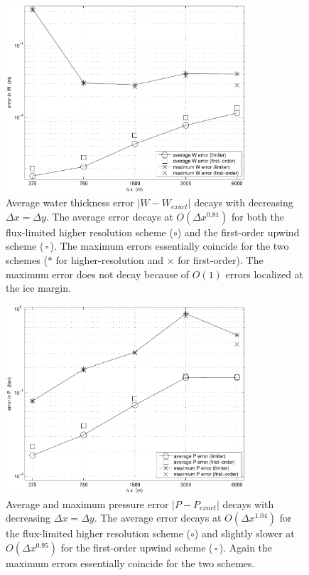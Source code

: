 \documentclass[11pt,final]{amsart}%
\begin{document}
\begin{figure}[ht]
\includegraphics[width=3.5in,keepaspectratio=true]{figs/refineW}
\caption{Average water thickness error $|W-W_{exact}|$ decays with decreasing $\Delta x = \Delta y$.  The average error decays at $O(\Delta x^{0.81})$ for both the flux-limited higher resolution scheme (\Large$\circ$\normalsize) and the first-order upwind scheme (\scriptsize\,$\square$\,\normalsize).  The maximum errors essentially coincide for the two schemes (\large$\ast$ \normalsize for higher-resolution and $\times$ for first-order).  The maximum error does not decay because of $O(1)$ errors localized at the ice margin.}
\label{fig:refineW}
\end{figure}

\begin{figure}[ht]
\includegraphics[width=3.5in,keepaspectratio=true]{figs/refineP}
\caption{Average and maximum pressure error $|P-P_{exact}|$ decays with decreasing $\Delta x = \Delta y$.  The average error decays at $O(\Delta x^{1.04})$ for the flux-limited higher resolution scheme (\Large$\circ$\normalsize) and slightly slower at $O(\Delta x^{0.95})$ for the first-order upwind scheme (\scriptsize\,$\square$\,\normalsize).  Again the maximum errors essentially coincide for the two schemes.}
\label{fig:refineP}
\end{figure}
\end{document}

